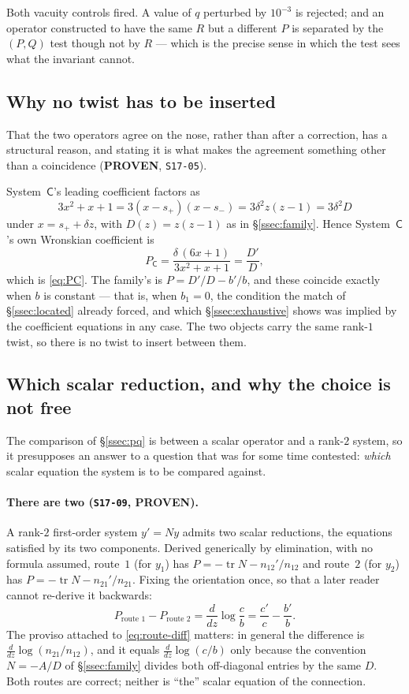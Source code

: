 Both vacuity controls fired. A value of $q$ perturbed by $10^{-3}$ is rejected;
and an operator constructed to have the same $R$ but a different $P$ is
separated by the $(P,Q)$ test though not by $R$ --- which is the precise sense
in which the test sees what the invariant cannot.

\subsection{Why no twist has to be inserted}\label{ssec:notwist}

That the two operators agree on the nose, rather than after a correction, has a
structural reason, and stating it is what makes the agreement something other
than a coincidence (\textbf{PROVEN}, \texttt{S17-05}).

System~$\mathsf C$'s leading coefficient factors as
\[
  3x^2+x+1=3(x-s_+)(x-s_-)=3\delta^2 z(z-1)=3\delta^2 D
\]
under $x=s_++\delta z$, with $D(z)=z(z-1)$ as in \S\ref{ssec:family}. Hence
System~$\mathsf C$'s own Wronskian coefficient is
\[
  P_{\mathsf C}=\frac{\delta\,(6x+1)}{3x^2+x+1}=\frac{D'}{D},
\]
which is \eqref{eq:PC}. The family's is $P=D'/D-b'/b$, and these coincide
exactly when $b$ is constant --- that is, when $b_1=0$, the condition
the match of \S\ref{ssec:located} already forced, and which
\S\ref{ssec:exhaustive} shows was implied by the coefficient equations in any
case. The two objects carry the same rank-$1$ twist, so there is no twist to
insert between them.

\subsection{Which scalar reduction, and why the choice is not
free}\label{ssec:route}

The comparison of \S\ref{ssec:pq} is between a scalar operator and a rank-$2$
system, so it presupposes an answer to a question that was for some time
contested: \emph{which} scalar equation the system is to be compared against.

\paragraph{There are two (\texttt{S17-09}, \textbf{PROVEN}).}
A rank-$2$ first-order system $y'=Ny$ admits two scalar reductions, the
equations satisfied by its two components. Derived generically by elimination,
with no formula assumed, route~$1$ (for $y_1$) has
$P=-\operatorname{tr}N-n_{12}'/n_{12}$ and route~$2$ (for $y_2$) has
$P=-\operatorname{tr}N-n_{21}'/n_{21}$. Fixing the orientation once, so that a
later reader cannot re-derive it backwards:
\begin{equation}\label{eq:route-diff}
  P_{\text{route }1}-P_{\text{route }2}
    =\frac{d}{dz}\log\frac{c}{b}
    =\frac{c'}{c}-\frac{b'}{b}.
\end{equation}
The proviso attached to \eqref{eq:route-diff} matters: in general the
difference is $\tfrac{d}{dz}\log(n_{21}/n_{12})$, and it equals
$\tfrac{d}{dz}\log(c/b)$ only because the convention $N=-A/D$ of
\S\ref{ssec:family} divides both off-diagonal entries by the same $D$. Both
routes are correct; neither is ``the'' scalar equation of the connection.

